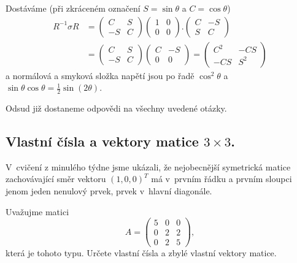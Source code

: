 Dostáváme (při zkráceném označení $S=\sin\theta$ a $C=\cos\theta$)
$$
\begin{aligned}
  R^{-1}\sigma R &=
  \begin{pmatrix}
    C & S\\ -S&C
  \end{pmatrix}
\begin{pmatrix}
  1 & 0 \\ 0& 0
\end{pmatrix}.
  \begin{pmatrix}
    C & -S\\ S&C
  \end{pmatrix}
  \\&=
  \begin{pmatrix}
    C & S\\ -S&C
  \end{pmatrix}
\begin{pmatrix}
  C & -S \\ 0& 0
\end{pmatrix}
=\begin{pmatrix}
  C^2 & -CS \\ -CS& S^2
\end{pmatrix}
\end{aligned}
$$
a normálová a smyková složka napětí jsou po řadě $\cos^2\theta$ a $\sin\theta \cos\theta = \frac 12 \sin(2\theta).$

Odsud již dostaneme odpovědi na všechny uvedené otázky.

\konec


\stranka
\subsection{Vlastní čísla a vektory matice $3\times 3$.}

V cvičení z minulého týdne jsme ukázali, že nejobecnější symetrická matice zachovávající směr vektoru  $(1,0,0)^T$ má v prvním řádku a prvním sloupci jenom jeden nenulový prvek, prvek v hlavní diagonále.

Uvažujme matici
\begin{equation*}
A=  \begin{pmatrix}
  5 & 0 & 0\\
  0 & 2 & 2\\
  0 & 2 & 5
\end{pmatrix},
\end{equation*}
která je tohoto typu.
Určete vlastní čísla a zbylé vlastní vektory matice.


